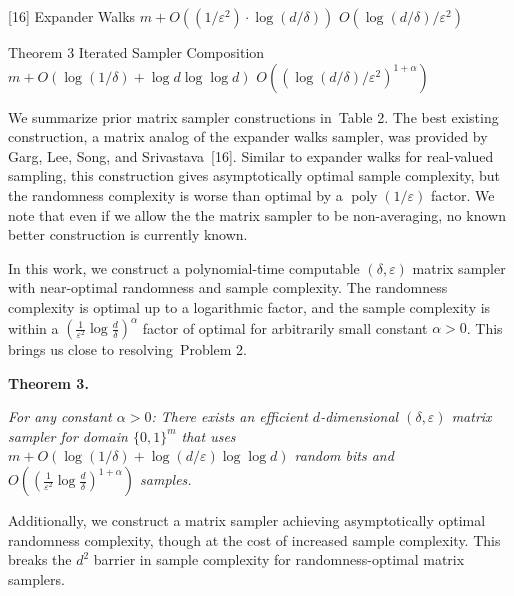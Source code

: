 \documentclass[10pt,a4paper]{article}
\begin{document}
[16] 
Expander Walks 
$m+O((1/\varepsilon^{2})\cdot\log(d/\delta))$ 
$O(\log(d/\delta)/\varepsilon^{2})$ 
\par


Theorem 3 
Iterated Sampler Composition 
$m+O(\log(1/\delta)+\log d\log\log d)$ 
$O((\log(d/\delta)/\varepsilon^{2})^{1+\alpha})$ 
\par







We summarize prior matrix sampler constructions in Table 2.
The best existing construction, a matrix analog of the expander walks sampler, was provided by Garg, Lee, Song, and Srivastava [16].
Similar to expander walks for real-valued sampling, this construction gives asymptotically optimal sample complexity, but the randomness complexity is worse than optimal by a $\operatorname*{poly}(1/\varepsilon)$ factor. We note that even if we allow the the matrix sampler to be non-averaging, no known better construction is currently known.\par




In this work, we construct a polynomial-time computable $(\delta,\varepsilon)$ matrix sampler with near-optimal randomness and sample complexity. The randomness complexity is optimal up to a logarithmic factor, and the sample complexity is within a $(\frac{1}{\varepsilon^{2}}\log\frac{d}{\delta})^{\alpha}$ factor of optimal for arbitrarily small constant $\alpha>0$. This brings us close to resolving Problem 2.\par






\par\medskip\noindent\textbf{
\textbf{Theorem 3}\textbf{.}
}\par



\emph{For any constant $\alpha>0$:
There exists an efficient $d$-dimensional $(\delta,\varepsilon)$ matrix sampler for domain $\{0,1\}^{m}$ that uses $m+O(\log(1/\delta)+\log(d/\varepsilon)\log\log d)$ random bits and $O((\frac{1}{\varepsilon^{2}}\log\frac{d}{\delta})^{1+\alpha})$ samples.}\par







Additionally, we construct a matrix sampler achieving asymptotically optimal randomness complexity, though at the cost of increased sample complexity. This breaks the $d^{2}$ barrier in sample complexity for randomness-optimal matrix samplers.\par
\end{document}
